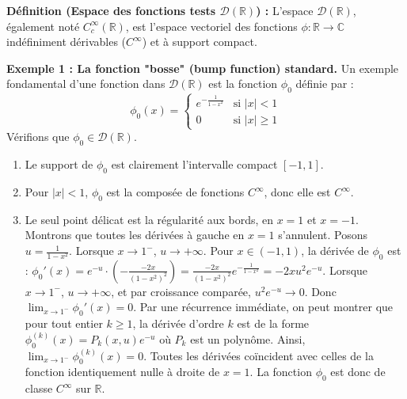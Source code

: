 \documentclass[11pt,a4paper]{article}
\begin{document}
\textbf{Définition (Espace des fonctions tests $\mathcal{D}(\mathbb{R})$) :} L'espace $\mathcal{D}(\mathbb{R})$, également noté $C_c^\infty(\mathbb{R})$, est l'espace vectoriel des fonctions $\phi : \mathbb{R} \to \mathbb{C}$ indéfiniment dérivables ($C^\infty$) et à support compact.

\textbf{Exemple 1 : La fonction "bosse" (bump function) standard.}
Un exemple fondamental d'une fonction dans $\mathcal{D}(\mathbb{R})$ est la fonction $\phi_0$ définie par :
$$
\phi_0(x) =
\begin{cases}
e^{-\frac{1}{1-x^2}} & \text{si } |x| < 1 \\
0 & \text{si } |x| \ge 1
\end{cases}
$$
Vérifions que $\phi_0 \in \mathcal{D}(\mathbb{R})$.
\begin{enumerate}
\item Le support de $\phi_0$ est clairement l'intervalle compact $[-1, 1]$.
\item Pour $|x| < 1$, $\phi_0$ est la composée de fonctions $C^\infty$, donc elle est $C^\infty$.
\item Le seul point délicat est la régularité aux bords, en $x=1$ et $x=-1$. Montrons que toutes les dérivées à gauche en $x=1$ s'annulent.
   Posons $u = \frac{1}{1-x^2}$. Lorsque $x \to 1^-$, $u \to +\infty$.
   Pour $x \in (-1, 1)$, la dérivée de $\phi_0$ est :
   $\phi_0'(x) = e^{-u} \cdot \left(- \frac{-2x}{(1-x^2)^2}\right) = \frac{-2x}{(1-x^2)^2} e^{-\frac{1}{1-x^2}} = -2x u^2 e^{-u}$.
   Lorsque $x \to 1^-$, $u \to +\infty$, et par croissance comparée, $u^2 e^{-u} \to 0$. Donc $\lim_{x \to 1^-} \phi_0'(x) = 0$.
   Par une récurrence immédiate, on peut montrer que pour tout entier $k \ge 1$, la dérivée d'ordre $k$ est de la forme $\phi_0^{(k)}(x) = P_k(x, u) e^{-u}$ où $P_k$ est un polynôme. Ainsi, $\lim_{x \to 1^-} \phi_0^{(k)}(x) = 0$.
   Toutes les dérivées coïncident avec celles de la fonction identiquement nulle à droite de $x=1$. La fonction $\phi_0$ est donc de classe $C^\infty$ sur $\mathbb{R}$.
\end{enumerate}

\begin{center}
\end{center}
\end{document}
